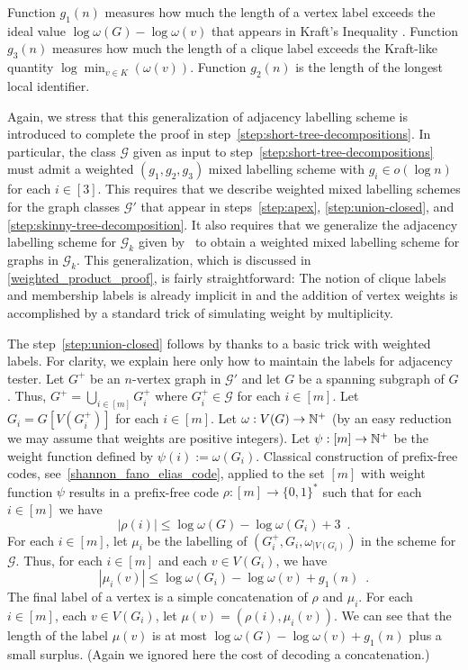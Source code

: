 \documentclass{patmorin}
\renewcommand{\le}{\leqslant}
\newcommand{\calG}{\mathcal{G}}
\begin{document}
Function $g_1(n)$ measures how much the length of a vertex label exceeds the ideal value $\log \omega(G) - \log\omega(v)$ that appears in Kraft's Inequality \cite{Kraft1949}. Function $g_3(n)$ measures how much the length of a clique label exceeds the Kraft-like quantity $\log\min_{v\in K}(\omega(v))$.  Function $g_2(n)$ is the length of the longest local identifier.


Again, we stress that this generalization of adjacency labelling scheme is introduced to complete the proof in step~\ref{step:short-tree-decompositions}.  In particular, the class $\calG$ given as input to step~\ref{step:short-tree-decompositions} must admit a weighted $(g_1,g_2,g_3)$ mixed labelling scheme with $g_i\in o(\log n)$ for each $i\in[3]$.  This requires that we describe weighted mixed labelling schemes for the graph classes $\calG'$ that appear in steps~\ref{step:apex}, \ref{step:union-closed}, and \ref{step:skinny-tree-decomposition}.  It also requires that we generalize the adjacency labelling scheme for $\calG_k$ given by~\citet{dujmovic.esperet.ea:adjacency} to obtain a weighted mixed labelling scheme for graphs in $\calG_k$.
This generalization, which is discussed in \cref{weighted_product_proof}, is fairly straightforward: The notion of clique labels and membership labels is already implicit in \cite{dujmovic.esperet.ea:adjacency} and the addition of vertex weights is accomplished by a  standard trick of simulating weight by multiplicity.


The step~\ref{step:union-closed} follows by thanks to a basic trick with weighted labels.
For clarity, we explain here only how to maintain the labels for adjacency tester.
Let $G^+$ be an $n$-vertex graph in $\calG'$ and let $G$ be a spanning subgraph of $G$. 
Thus,
$G^+=\bigcup_{i\in[m]}G^+_i$ where $G^+_i\in\calG$ for each $i\in[m]$. 
Let $G_i=G[V(G^+_i)]$ for each $i\in[m]$. 
Let $\omega: V(G)\to\mathbb{N}^+$ (by an easy reduction we may assume that weights are positive integers). 
Let $\psi:[m]\to\mathbb{N}^+$ be the weight function defined by $\psi(i):=\omega(G_i)$. 
Classical construction of prefix-free codes, 
see~\cref{shannon_fano_elias_code}, applied to the set $[m]$ with weight function $\psi$ 
results in a prefix-free code $\rho:[m]\to\{0,1\}^*$ such that for each $i\in[m]$ we have
\[
|\rho(i)|\le\log \omega(G)-\log \omega(G_i)+3\enspace.
\]
For each $i\in[m]$, 
let $\mu_i$ be the labelling of $(G_i^+,G_i,\omega_{|V(G_i)})$ in the scheme for $\calG$. 
Thus, for each $i\in[m]$ and each $v\in V(G_i)$, we have 
\[
|\mu_i(v)| \le \log\omega(G_i) - \log\omega(v) + g_1(n)\enspace.
\]
The final label of a vertex is a simple concatenation of $\rho$ and $\mu_i$. 
For each $i\in[m]$, each $v\in V(G_i)$, let $\mu(v)=(\rho(i),\mu_i(v))$. 
We can see that the length of the label $\mu(v)$ is at most $\log\omega(G)-\log\omega(v)+g_1(n)$ plus a small surplus. 
(Again we ignored here the cost of decoding a concatenation.) 
\end{document}
